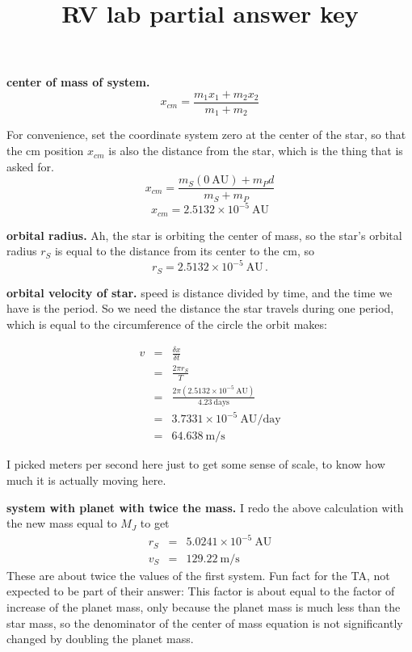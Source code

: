\documentclass{article}
\title{RV lab partial answer key}
\begin{document}
\maketitle

\textbf{center of mass of system.}
\begin{equation}
	x_{cm} = \frac{m_1 x_1 + m_2 x_2}{m_1 + m_2}
\end{equation}

For convenience, set the coordinate system zero at the center of the star, so that the cm position $x_{cm}$ is also the distance from the star, which is the thing that is asked for.
\begin{equation}
	x_{cm} = \frac{m_S (0\:\textrm{AU}) + m_P d}{m_S + m_P}
\end{equation}
\begin{equation}
	x_{cm} = 2.5132 \times 10^{-5}\:\textrm{AU}
\end{equation}

\textbf{orbital radius.} Ah, the star is orbiting the center of mass, so the star's orbital radius $r_S$ is equal to the distance from its center to the cm, so
\begin{equation}
	r_S = 2.5132\times 10^{-5}\:\textrm{AU} \,.
\end{equation}

\textbf{orbital velocity of star.} speed is distance divided by time, and the time we have is the period. So we need the distance the star travels during one period, which is equal to the circumference of the circle the orbit makes:

\begin{eqnarray}
	v &=& \frac{\delta x}{\delta t} \\
	&=& \frac{2 \pi r_S}{T} \\
	&=& \frac{2 \pi (2.5132 \times 10^{-5}\:\textrm{AU})}{4.23\:\textrm{days}} \\
	&=& 3.7331 \times 10^{-5}\:\textrm{AU}/\textrm{day} \\
	&=& 64.638 \:\textrm{m}/\textrm{s}
\end{eqnarray}

I picked meters per second here just to get some sense of scale, to know how much it is actually moving here.

\textbf{system with planet with twice the mass.} I redo the above calculation with the new mass equal to $M_J$ to get
\begin{eqnarray}
	r_S &=& 5.0241 \times 10^{-5}\:\textrm{AU} \\
	v_S &=& 129.22 \:\textrm{m}/\textrm{s}
\end{eqnarray}
These are about twice the values of the first system. Fun fact for the TA, not expected to be part of their answer: This factor is about equal to the factor of increase of the planet mass, only because the planet mass is much less than the star mass, so the denominator of the center of mass equation is not significantly changed by doubling the planet mass.
\end{document}
